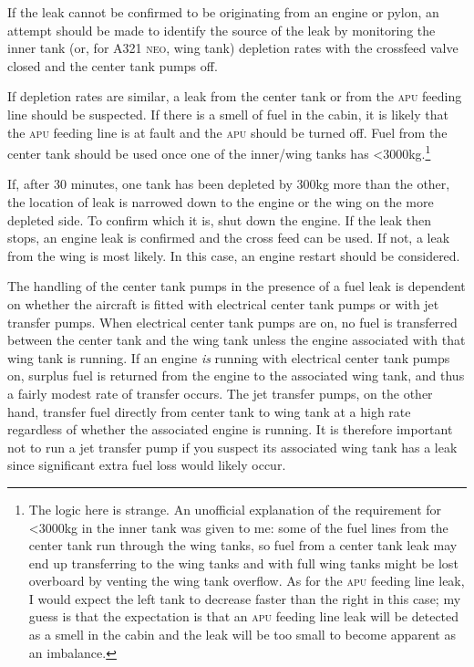 \documentclass[a5paper,11pt,twoside]{book}
\newcommand{\ac}[1]{{\scshape\MakeLowercase{#1}}}
\begin{document}
If the leak cannot be confirmed to be originating from an engine or pylon, an
attempt should be made to identify the source of the leak by monitoring the
inner tank (or, for A321 \ac{NEO}, wing tank) depletion rates with the crossfeed
valve closed and the center tank pumps off.

If depletion rates are similar, a leak from the center tank or from the \ac{APU}
feeding line should be suspected. If there is a smell of fuel in the cabin, it
is likely that the \ac{APU} feeding line is at fault and the \ac{APU} should be
turned off. Fuel from the center tank should be used once one of the inner/wing
tanks has <3000kg.\footnote{The logic here is strange. An unofficial explanation
of the requirement for <3000kg in the inner tank was given to me: some of the
fuel lines from the center tank run through the wing tanks, so fuel from a
center tank leak may end up transferring to the wing tanks and with full wing
tanks might be lost overboard by venting the wing tank overflow. As for the
\ac{APU} feeding line leak, I would expect the left tank to decrease faster than
the right in this case; my guess is that the expectation is that an \ac{APU}
feeding line leak will be detected as a smell in the cabin and the leak will be
too small to become apparent as an imbalance.}

If, after 30 minutes, one tank has been depleted by 300kg more than the other,
the location of leak is narrowed down to the engine or the wing on the more
depleted side. To confirm which it is, shut down the engine.  If the leak then
stops, an engine leak is confirmed and the cross feed can be used. If not, a
leak from the wing is most likely. In this case, an engine restart should be
considered.

The handling of the center tank pumps in the presence of a fuel leak is
dependent on whether the aircraft is fitted with electrical center tank pumps or
with jet transfer pumps. When electrical center tank pumps are on, no fuel is
transferred between the center tank and the wing tank unless the engine
associated with that wing tank is running. If an engine \emph{is} running with
electrical center tank pumps on, surplus fuel is returned from the engine to the
associated wing tank, and thus a fairly modest rate of transfer occurs. The jet
transfer pumps, on the other hand, transfer fuel directly from center tank to
wing tank at a high rate regardless of whether the associated engine is
running. It is therefore important not to run a jet transfer pump if you suspect
its associated wing tank has a leak since significant extra fuel loss would
likely occur.
\end{document}
